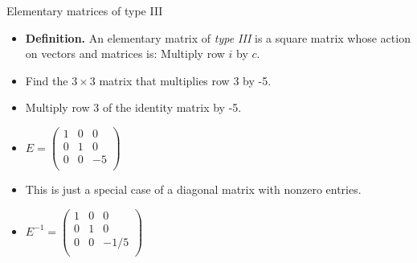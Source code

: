 \documentclass{beamer}
\begin{document}
\begin{frame}{Elementary matrices of type III}

\begin{itemize}
\item \textbf{Definition.} An elementary matrix of \emph{type III} is a square
matrix whose action on vectors and matrices is: Multiply row $i$ by $c$.
\item Find the $3\times 3$ matrix that multiplies row 3 by -5.
\item Multiply row 3 of the identity matrix by -5.
\item $
E = \begin{pmatrix}
1 & 0 & 0 \\
0 & 1 & 0 \\
0 & 0 & -5 \\
\end{pmatrix}
$
\item This is just a special case of a diagonal matrix with nonzero entries.
\item $
E^{-1} = \begin{pmatrix}
1 & 0 & 0 \\
0 & 1 & 0 \\
0 & 0 & -1/5 \\
\end{pmatrix}
$
\end{itemize}
\end{frame}
\end{document}
